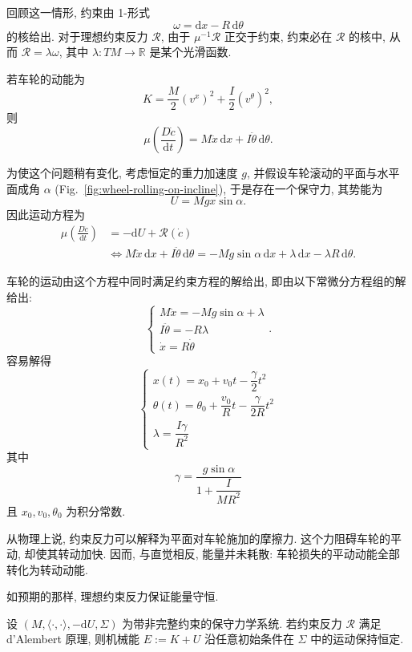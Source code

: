 \begin{RiemannExample}[无滑动滚动的车轮]\label{ex:wheel-rolling-down-incline}
回顾这一情形, 约束由 1-形式
\[
  \omega=\mathrm{d}x-R\,\mathrm{d}\theta
\]
的核给出. 对于理想约束反力 $\mathcal{R}$, 由于 $\mu^{-1}\mathcal{R}$ 正交于约束, 约束必在 $\mathcal{R}$ 的核中, 从而 $\mathcal{R}=\lambda\omega$, 其中 $\lambda:TM\to\mathbb{R}$ 是某个光滑函数.

若车轮的动能为
\[
  K=\frac{M}{2}(v^x)^2+\frac{I}{2}(v^\theta)^2,
\]
则
\[
  \mu\left(\frac{D\dot c}{\mathrm{d}t}\right)
  =M\ddot x\,\mathrm{d}x+I\ddot\theta\,\mathrm{d}\theta.
\]

为使这个问题稍有变化, 考虑恒定的重力加速度 $g$, 并假设车轮滚动的平面与水平面成角 $\alpha$ (Fig.~\ref{fig:wheel-rolling-on-incline}), 于是存在一个保守力, 其势能为
\[
  U=Mgx\sin\alpha.
\]
因此运动方程为
\begin{align*}
  \mu\left(\frac{D\dot c}{\mathrm{d}t}\right)
  &=-\mathrm{d}U+\mathcal{R}(\dot c)\\
  &\iff M\ddot x\,\mathrm{d}x+I\ddot\theta\,\mathrm{d}\theta
  =-Mg\sin\alpha\,\mathrm{d}x+\lambda\,\mathrm{d}x-\lambda R\,\mathrm{d}\theta.
\end{align*}

车轮的运动由这个方程中同时满足约束方程的解给出, 即由以下常微分方程组的解给出:
\[
  \begin{cases}
    M\ddot x=-Mg\sin\alpha+\lambda\\
    I\ddot\theta=-R\lambda\\
    \dot x=R\dot\theta
  \end{cases}.
\]
容易解得
\[
  \begin{cases}
    x(t)=x_0+v_0t-\dfrac{\gamma}{2}t^2\\[.4ex]
    \theta(t)=\theta_0+\dfrac{v_0}{R}t-\dfrac{\gamma}{2R}t^2\\[.4ex]
    \lambda=\dfrac{I\gamma}{R^2}
  \end{cases}
\]
其中
\[
  \gamma=\frac{g\sin\alpha}{1+\dfrac{I}{MR^2}}
\]
且 $x_0,v_0,\theta_0$ 为积分常数.

从物理上说, 约束反力可以解释为平面对车轮施加的摩擦力. 这个力阻碍车轮的平动, 却使其转动加快. 因而, 与直觉相反, 能量并未耗散: 车轮损失的平动动能全部转化为转动动能.
\end{RiemannExample}

如预期的那样, 理想约束反力保证能量守恒.

\begin{RiemannTheorem}\label{thm:energy-under-perfect-nonholonomic-reaction}
设 $(M,\langle\cdot,\cdot\rangle,-\mathrm{d}U,\Sigma)$ 为带非完整约束的保守力学系统. 若约束反力 $\mathcal{R}$ 满足 d’Alembert 原理, 则机械能 $E:=K+U$ 沿任意初始条件在 $\Sigma$ 中的运动保持恒定.
\end{RiemannTheorem}

